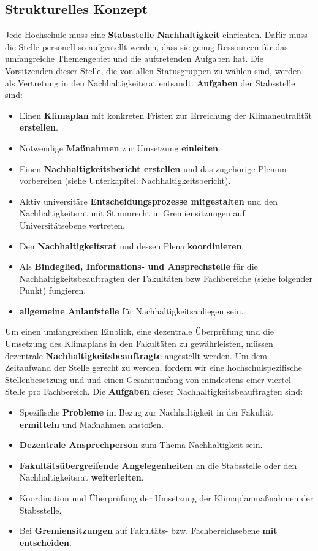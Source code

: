 \documentclass[DIV=calc]{scrartcl}
\newcommand{\replace}[2]{
    \sout{\textcolor{blue}{#1}}~\textcolor{blue}{#2}}
\newcommand{\delete}[1]{
    \sout{\textcolor{red}{#1}}}
\newcommand{\add}[1]{
    \textcolor{blue}{#1}}
\begin{document}
\subsection*{Strukturelles Konzept}
Jede Hochschule muss eine \textbf{Stabsstelle Nachhaltigkeit} einrichten. Dafür muss die Stelle personell so aufgestellt werden, dass sie genug Ressourcen für das umfangreiche Themengebiet und die auftretenden Aufgaben hat. 
Die Vorsitzenden dieser Stelle, die von allen Statusgruppen zu wählen sind, 
werden als Vertretung in den Nachhaltigkeitsrat entsandt. 
\textbf{Aufgaben} der Stabsstelle sind:
\begin{itemize}
    \item Einen \textbf{Klimaplan} mit konkreten Fristen zur Erreichung der Klimaneutralität \textbf{erstellen}.
\item Notwendige \textbf{Maßnahmen} zur Umsetzung \textbf{einleiten}.
\item Einen \textbf{Nachhaltigkeitsbericht erstellen} und das zugehörige Plenum vorbereiten (siehe Unterkapitel: Nachhaltigkeitsbericht).
\item Aktiv universitäre \textbf{Entscheidungsprozesse mitgestalten} und den Nachhaltigkeitsrat  mit Stimmrecht in Gremiensitzungen auf Universitätsebene vertreten.
\item Den \textbf{Nachhaltigkeitsrat} und dessen Plena \textbf{koordinieren}. 
\item Als \textbf{Bindeglied, Informations- und Ansprechstelle} für die Nachhaltigkeitsbeauftragten der Fakultäten bzw Fachbereiche (siehe folgender Punkt) fungieren. 
\item \textbf{allgemeine Anlaufstelle} für Nachhaltigkeitsanliegen sein.
\end{itemize}
Um einen umfangreichen Einblick, eine dezentrale Überprüfung und die Umsetzung des Klimaplans in den Fakultäten zu gewährleisten, müssen 
dezentrale \textbf{Nachhaltigkeitsbeauftragte} angestellt werden. 
Um dem Zeitaufwand der Stelle gerecht zu werden, fordern wir eine hochschulspezifische Stellenbesetzung und %
und einen Gesamtumfang von mindestens einer viertel Stelle pro Fachbereich.
Die \textbf{Aufgaben} dieser Nachhaltigkeitsbeauftragten sind: 
\begin{itemize}
    \item Spezifische \textbf{Probleme} im Bezug zur Nachhaltigkeit in der Fakultät \textbf{ermitteln} und Maßnahmen anstoßen. 
\item \textbf{Dezentrale Ansprechperson} zum Thema Nachhaltigkeit sein. 
\item \textbf{Fakultätsübergreifende Angelegenheiten} an die Stabsstelle oder den Nachhaltigkeitsrat \textbf{weiterleiten}.
\item Koordination und Überprüfung der Umsetzung der Klimaplanmaßnahmen der Stabsstelle.
\item Bei \textbf{Gremiensitzungen} auf Fakultäts- bzw. Fachbereichsebene \textbf{mit entscheiden}.
\end{itemize}
\end{document}
